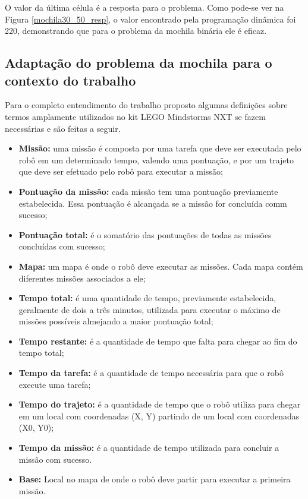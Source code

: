 O valor da última célula é a resposta para o problema. Como pode-se ver na Figura \ref{mochila30_50_resp}, o valor encontrado pela programação dinâmica foi 220, demonstrando que para o problema da mochila binária ele é eficaz.
 
\subsection{Adaptação do problema da mochila para o contexto do trabalho}
Para o completo entendimento do trabalho proposto algumas definições sobre termos amplamente utilizados no kit LEGO Mindstorms NXT se fazem necessárias e são feitas a seguir.
\begin{itemize}
\item \textbf{Missão:} uma missão é composta por uma tarefa que deve ser executada pelo robô em um determinado tempo, valendo uma pontuação, e por um trajeto que deve ser efetuado pelo robô para executar a missão;
\item \textbf{Pontuação da missão:} cada missão tem uma pontuação previamente estabelecida. Essa pontuação é alcançada se a missão for concluída comm sucesso;
\item \textbf{Pontuação total:} é o somatório das pontuações de todas as missões concluídas com sucesso;
\item \textbf{Mapa:} um mapa é onde o robô deve executar as missões. Cada mapa contém diferentes missões associados a ele;
\item \textbf{Tempo total:} é uma quantidade de tempo, previamente estabelecida, geralmente de dois a três minutos, utilizada para executar o máximo de missões possíveis almejando a maior pontuação total;
\item \textbf{Tempo restante:} é a quantidade de tempo que falta para chegar ao fim do tempo total;
\item \textbf{Tempo da tarefa:}  é a quantidade de tempo necessária para que o robô execute uma tarefa;
\item \textbf{Tempo do trajeto:} é a quantidade de tempo que o robô utiliza para chegar em um local com coordenadas (X, Y) partindo de um local com coordenadas (X0, Y0);
\item \textbf{Tempo da missão:} é a quantidade de tempo utilizada para concluir a missão com sucesso.
\item \textbf{Base:} Local no mapa de onde o robô deve partir para executar a primeira missão. 
\end{itemize}

